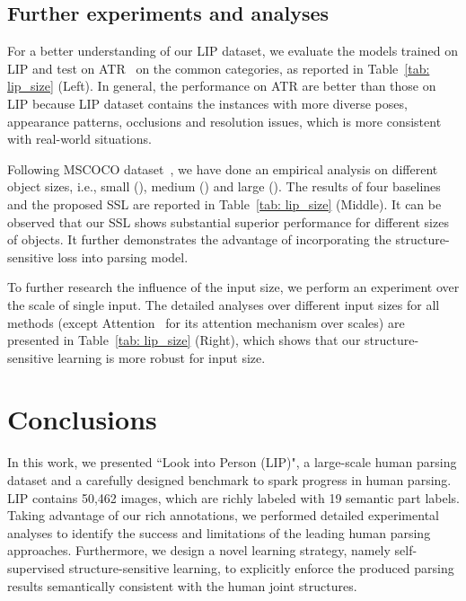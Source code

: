 \documentclass[10pt,twocolumn,letterpaper]{article}
\begin{document}
\subsection{Further experiments and analyses}
For a better understanding of our LIP dataset, we evaluate the models trained on LIP and test on ATR~\cite{Co-CNN} on the common categories, as reported in Table~\ref{tab: lip_size} (Left). In general, the performance on ATR are better than those on LIP because LIP dataset contains the instances with more diverse poses, appearance patterns, occlusions and resolution issues, which is more consistent with real-world situations. 

Following MSCOCO dataset~\cite{DBLP:journals/corr/LinMBHPRDZ14}, we have done an empirical analysis on different object sizes, i.e., small (), medium () and large (). The results of four baselines and the proposed SSL are reported in Table~\ref{tab: lip_size} (Middle). It can be observed that our SSL shows substantial superior performance for different sizes of objects. It further demonstrates the advantage of incorporating the structure-sensitive loss into parsing model.

To further research the influence of the input size, we perform an experiment over the scale of single input. The detailed analyses over different input sizes for all methods (except Attention~\cite{chen2015attention} for its attention mechanism over scales) are presented in Table~\ref{tab: lip_size} (Right), which shows that our structure-sensitive learning is more robust for input size.


\section{Conclusions}
In this work, we presented ``Look into Person (LIP)", a large-scale human parsing dataset and a carefully designed benchmark to spark progress in human parsing. LIP contains 50,462 images, which are richly labeled with 19 semantic part labels. Taking advantage of our rich annotations, we performed detailed experimental analyses to identify the success and limitations of the leading human parsing approaches. Furthermore, we design a novel learning strategy, namely self-supervised structure-sensitive learning, to explicitly enforce the produced parsing results semantically consistent with the human joint structures. 



{\small


}
\end{document}
